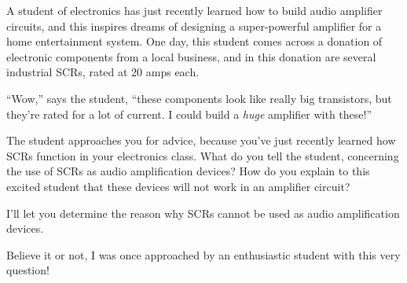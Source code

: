 

A student of electronics has just recently learned how to build audio amplifier circuits, and this inspires dreams of designing a super-powerful amplifier for a home entertainment system.  One day, this student comes across a donation of electronic components from a local business, and in this donation are several industrial SCRs, rated at 20 amps each.

``Wow,'' says the student, ``these components look like really big transistors, but they're rated for a lot of current.  I could build a {\it huge} amplifier with these!''

The student approaches you for advice, because you've just recently learned how SCRs function in your electronics class.  What do you tell the student, concerning the use of SCRs as audio amplification devices?  How do you explain to this excited student that these devices will not work in an amplifier circuit?







I'll let you determine the reason why SCRs cannot be used as audio amplification devices.







Believe it or not, I was once approached by an enthusiastic student with this very question!





